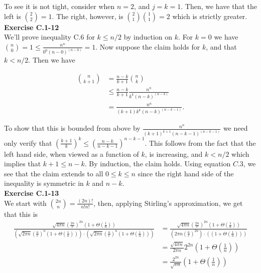 \documentclass{article}
\begin{document}
To see it is not tight, consider when $n=2$, and $j=k=1$. Then, we have that the left is $\binom{2}{2} = 1$. The right, however, is $\binom{2}{1}\binom{1}{1} = 2$ which is strictly greater.\\

\noindent\textbf{Exercise C.1-12}\\

We'll prove inequality C.6 for $k \leq n/2$ by induction on $k$. For $k=0$ we have ${n \choose 0} = 1 \leq \frac{n^n}{0^0 (n-0)^{(n-0)}} = 1$. Now suppose the claim holds for $k$, and that $k < n/2$.  Then we have 

\begin{align*} 
{n \choose k+1} &= \frac{n-k}{k+1} {n \choose k} \\
&\leq \frac{n-k}{k+1} \frac{n^n}{k^k(n-k)^{(n-k)}} \\
&=\frac{n^n}{(k+1)k^k(n-k)^{(n-k-1)}}.
\end{align*}

To show that this is bounded from above by $\frac{n^n}{(k+1)^{k+1}(n-k-1)^{(n-k-1)}}$ we need only verify that $\left(\frac{k+1}{k}\right)^k \leq \left(\frac{n-k}{n-k-1}\right)^{n-k-1}$.  This follows from the fact that the left hand side, when viewed as a function of $k$, is increasing, and $k < n/2$ which implies that $k+1 \leq n-k$.  By induction, the claim holds.  Using equation $C.3$, we see that the claim extends to all $0 \leq k \leq n$ since the right hand side of the inequality is symmetric in $k$ and $n-k$. \\

\noindent\textbf{Exercise C.1-13}\\

We start with $\binom{2n}{n} = \frac{(2n)!}{n!n!}$, then, applying Stirling's approximation, we get that this is
\begin{align*}
\frac{\sqrt{4\pi n}\left(\frac{2n}{e}\right)^{2n}\left(1 + \Theta\left(\frac{1}{n}\right)\right)}{\left(\sqrt{2\pi n}\left(\frac{n}{e}\right)^{n}\left(1 + \Theta\left(\frac{1}{n}\right)\right)\right)\cdot\left(\sqrt{2\pi n}\left(\frac{n}{e}\right)^{n}\left(1 + \Theta\left(\frac{1}{n}\right)\right)\right)} &= \frac{\sqrt{4\pi n}\left(\frac{2n}{e}\right)^{2n}\left(1 + \Theta\left(\frac{1}{n}\right)\right)}{\left(2\pi n\left(\frac{n}{e}\right)^{2n}\right)\cdot\left(\left(1 + \Theta\left(\frac{1}{n}\right)\right)\right)}\\
&= \frac{\sqrt{4\pi n}}{2\pi n} 2^{2n} \left(1 + \Theta\left(\frac{1}{n}\right)\right)\\
&= \frac{2^{2n}}{\sqrt{\pi n}} \left(1 + \Theta\left(\frac{1}{n}\right)\right)
\end{align*}
\end{document}
